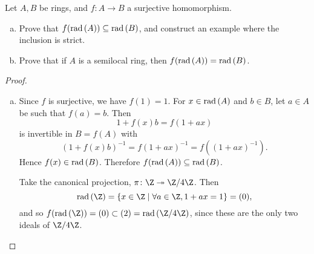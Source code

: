\documentclass[10pt]{amsart}
\begin{document}
\begin{thm}
  Let $A,B$ be rings, and $f \colon A \rightarrow B$ a surjective homomorphism.
  \begin{enumerate}[(a)]
  \item
    Prove that $f(\operatorname{rad}{\left( A \right)}) \subseteq \operatorname{rad}{\left( B \right)}$, and construct an example where the inclusion is strict.
  \item
    Prove that if $A$ is a semilocal ring, then $f(\operatorname{rad}{\left( A \right)}) = \operatorname{rad}{\left( B \right)}$.
  \end{enumerate}

  \begin{proof}
    \begin{enumerate}[(a)]
    \item
      Since $f$ is surjective, we have $f(1) = 1$.
      For $x \in \operatorname{rad}{\left( A \right)}$ and $b \in B$, let $a \in A$ be such that $f(a) = b$.
      Then
      $$1 + f(x)b = f(1 + ax)$$
      is invertible in $B = f(A)$ with
      $$\left(1 + f(x)b\right)^{-1} = f(1 + ax)^{-1} = f\left( (1 + ax)^{-1}\right).$$
      Hence $f(x) \in \operatorname{rad}{\left( B \right)}$.
      Therefore $f(\operatorname{rad}{\left( A \right)}) \subseteq \operatorname{rad}{\left( B \right)}$.

      Take the canonical projection, $\pi \colon \Z \twoheadrightarrow \Z/4\Z$.
      Then
      $$\rad{\Z} = \left\{x \in \Z \;\middle\vert\; \forall a \in \Z, 1 + ax = 1\right\} = (0),$$
      and so $f(\rad{\Z}) = (0) \subset (2) = \rad{\Z/4\Z}$, since these are the only two ideals of $\Z/4\Z$.
    \end{enumerate}
  \end{proof}
\end{thm}
\end{document}
